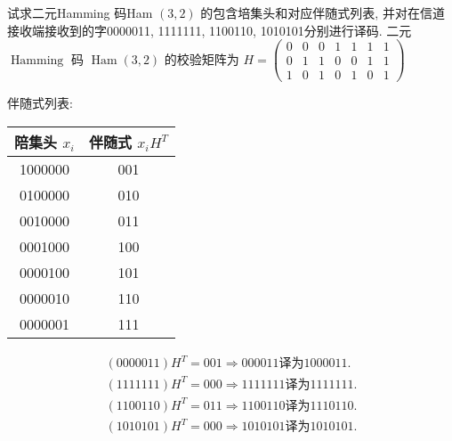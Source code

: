 \newpage

 \begin{tcolorbox}[breakable,colback=blue!5!white,colframe=blue!75!black,
 title= 解答题]
试求二元Hamming 码Ham $ (3,2) $ 的包含培集头和对应伴随式列表, 并对在信道接收端接收到的字0000011, 1111111, 1100110, 1010101分别进行译码.
 \tcblower
二元 $ \operatorname{Hamming} $ 码 $ \operatorname{Ham}(3,2) $ 的校验矩阵为
$
H=\left(\begin{array}{lllllll}
0 & 0 & 0 & 1 & 1 & 1 & 1 \\
0 & 1 & 1 & 0 & 0 & 1 & 1 \\
1 & 0 & 1 & 0 & 1 & 0 & 1
\end{array}\right)
$

伴随式列表:
\begin{center}
\begin{tabular}{|c|c|}
\hline 陪集头 $ x_{i} $ & 伴随式 $ x_{i} H^{T} $ \\
\hline 1000000 & 001 \\
\hline 0100000 & 010 \\
\hline 0010000 & 011 \\
\hline 0001000 & 100 \\
\hline 0000100 & 101 \\
\hline 0000010 & 110 \\
\hline 0000001 & 111 \\
\hline
\end{tabular}
\end{center}
$$
\begin{gathered}
(0000011)H^T =001\Rightarrow 000011\text{译为}1000011. \\
(1111111)H^T =000\Rightarrow 1111111\text{译为}1111111. \\
(1100110)H^T =011\Rightarrow1100110\text{译为}1110110. \\
(1010101)H^T =000\Rightarrow1010101\text{译为}1010101. 
\end{gathered}
$$
 \end{tcolorbox}

